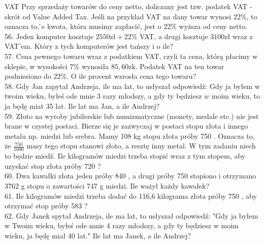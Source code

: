 \documentclass[10pt]{article}
\begin{document}
VAT Przy sprzedaży towarów do ceny netto, doliczany jest tzw. podatek VAT - skrót od Value Added Tax. Jeśli na przyklad VAT na dany towar wynosi 22\%, to oznacza to, ̇̇e kwota, która musimy zapłacić, jest o 22\% wyższa od ceny netto.\\
56. Jeden komputer kosztuje \(2550 \mathrm{zł}+22 \%\) VAT, a drugi kosztuje \(3100 \mathrm{zł}\) wraz z VAT'em. Który z tych komputerów jest tańszy i o ile?\\
57. Cena pewnego towaru wraz z podatkiem VAT, czyli ta cena, którą płacimy w sklepie, w wysokości \(7 \%\) wynosiła \(85,60 \mathrm{zk}\). Podatek VAT na ten towar podniesiono do \(22 \%\). O ile procent wzrosła cena tego towaru?\\
58. Gdy Jan zapytał Andrzeja, ile ma lat, to usłyszał odpowiedź: Gdy ja byłem w twoim wieku, byłeś ode mnie 3 razy młodszy, a gdy ty będziesz \(w\) moim wieku, to ja będę miat 35 lat. Ile lat ma Jan, a ile Andrzej?\\
59. Złoto na wyroby jubilerskie lub numizmatyczne (monety, medale etc.) nie jest brane w czystej postaci. Bierze się je zazwyczaj w postaci stopu złota i innego metalu np. miedzi lub srebra. Mamy 108 kg stopu złota próby 750 . Oznacza to, że \(\frac{750}{1000}\) masy tego stopu stanowi złoto, a resztę inny metal. W tym zadaniu niech to będzie miedź. Ile kilogramów miedzi trzeba stopić wraz z tym stopem, aby uzyskać stop złota próby 720 ?\\
60. Dwa kawałki złota jeden próby 840 , a drugi próby 750 stopiono i otrzymano 3762 g stopu o zawartości 747 g miedzi. Ile ważył każdy kawałek?\\
61. Ile kilogramów miedzi trzeba dodać do 116,6 kilograma złota próby 750 , aby otrzymać stop próby 583 ?\\
62. Gdy Janek spytał Andrzeja, ile ma lat, to usłyszał odpowiedź: "Gdy ja byłem w Twoim wieku, byłeś ode mnie 4 razy młodszy, a gdy ty będziesz w moim wieku, ja będę miał 40 lat." Ile lat ma Janek, a ile Andrzej?
\end{document}
